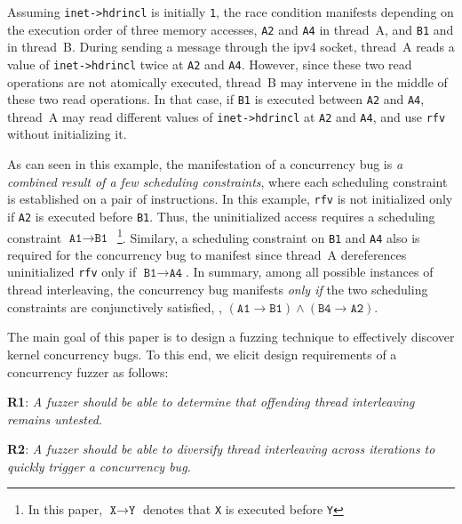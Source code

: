 Assuming \texttt{inet->hdrincl} is initially \texttt{1}, the race
condition manifests depending on the execution order of three memory
accesses, \texttt{A2} and \texttt{A4} in thread~A, and \texttt{B1} and
in thread~B.
%
During sending a message through the ipv4 socket, thread~A reads a
value of \texttt{inet->hdrincl} twice at \texttt{A2} and \texttt{A4}.
%
However, since these two read operations are not atomically executed,
thread~B may intervene in the middle of these two read operations.
%
In that case, if \texttt{B1} is executed between \texttt{A2} and
\texttt{A4}, thread~A may read different values of
\texttt{inet->hdrincl} at \texttt{A2} and \texttt{A4}, and use
\texttt{rfv} without initializing it.



As can seen in this example, the manifestation of a concurrency bug is
\textit{a combined result of a few scheduling constraints}, where each
scheduling constraint is established on a pair of instructions.
%
In this example, \texttt{rfv} is not initialized only if \texttt{A2}
is executed before \texttt{B1}. Thus, the uninitialized access
requires a scheduling constraint
$\texttt{A1} \rightarrow \texttt{B1}$~\footnote{In this paper,
  $\texttt{X} \rightarrow \texttt{Y}$ denotes that \texttt{X} is
  executed before \texttt{Y}}.
%
Similary, a scheduling constraint on \texttt{B1} and \texttt{A4} also
is required for the concurrency bug to manifest since thread~A
dereferences uninitialized \texttt{rfv} only if
$\texttt{B1} \rightarrow \texttt{A4}$.
%
In summary, among all possible instances of thread interleaving, the
concurrency bug manifests \textit{only if} the two scheduling
constraints are conjunctively satisfied, \ie,
$(\texttt{A1} \rightarrow \texttt{B1}) \wedge (\texttt{B4} \rightarrow
\texttt{A2})$.


%
%
The main goal of this paper is to design a fuzzing technique to
effectively discover kernel concurrency bugs. To this end, we elicit
design requirements of a concurrency fuzzer as follows:

\vspace{0.4em}
%
\textbf{R1}: \emph{A fuzzer should be able to determine that offending
  thread interleaving remains untested.}

\textbf{R2}: \emph{A fuzzer should be able to diversify thread
  interleaving across iterations to quickly trigger a concurrency
  bug.}
%
\vspace{0.4em}

